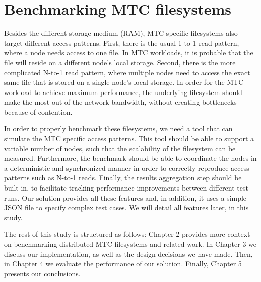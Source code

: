 

\section{Benchmarking MTC filesystems}

Besides the different storage medium (RAM), MTC-specific filesystems also target different access patterns. First, there is the usual 1-to-1 read pattern, where a node needs access to one file. In MTC workloads, it is probable that the file will reside on a different node's local storage. Second, there is the more complicated N-to-1 read pattern, where multiple nodes need to access the exact same file that is stored on a single node's local storage. In order for the MTC workload to achieve maximum performance, the underlying filesystem should make the most out of the network bandwidth, without creating bottlenecks because of contention.

In order to properly benchmark these filesystems, we need a tool that can simulate the MTC specific access patterns. This tool should be able to support a variable number of nodes, such that the scalability of the filesystem can be measured. Furthermore, the benchmark should be able to coordinate the nodes in a deterministic and synchronized manner in order to correctly reproduce access patterns such as N-to-1 reads. Finally, the results aggregation step should be built in, to facilitate tracking performance improvements between different test runs. Our solution provides all these features and, in addition, it uses a simple JSON\cite{json} file to specify complex test cases. We will detail all features later, in this study.


The rest of this study is structured as follows: Chapter 2 provides more context on benchmarking distributed MTC filesystems and related work. In Chapter 3 we discuss our implementation, as well as the design decisions we have made. Then, in Chapter 4 we evaluate the performance of our solution. Finally, Chapter 5 presents our conclusions.
